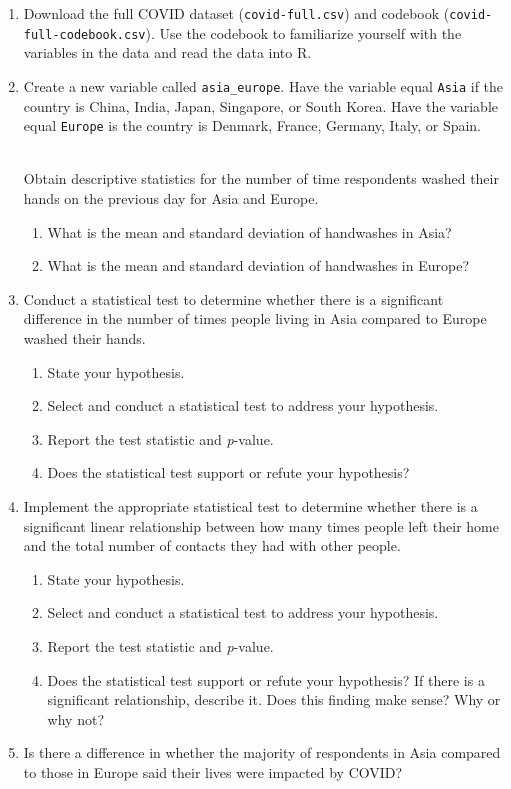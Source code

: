 \documentclass[
]{article}
\providecommand{\tightlist}{%
  \setlength{\itemsep}{0pt}\setlength{\parskip}{0pt}}\usepackage{longtable,booktabs,array}
\begin{document}
\begin{enumerate}
\def\labelenumi{\arabic{enumi})}
\item
  Download the full COVID dataset (\texttt{covid-full.csv}) and codebook
  (\texttt{covid-full-codebook.csv}). Use the codebook to familiarize
  yourself with the variables in the data and read the data into R.
\item
  Create a new variable called \texttt{asia\_europe}. Have the variable
  equal \texttt{Asia} if the country is China, India, Japan, Singapore,
  or South Korea. Have the variable equal \texttt{Europe} is the country
  is Denmark, France, Germany, Italy, or Spain.\\
  \strut \\
  Obtain descriptive statistics for the number of time respondents
  washed their hands on the previous day for Asia and Europe.

  \begin{enumerate}
  \def\labelenumii{\alph{enumii})}
  \tightlist
  \item
    What is the mean and standard deviation of handwashes in Asia?
  \item
    What is the mean and standard deviation of handwashes in Europe?
  \end{enumerate}
\item
  Conduct a statistical test to determine whether there is a significant
  difference in the number of times people living in Asia compared to
  Europe washed their hands.

  \begin{enumerate}
  \def\labelenumii{\alph{enumii})}
  \tightlist
  \item
    State your hypothesis.
  \item
    Select and conduct a statistical test to address your hypothesis.
  \item
    Report the test statistic and \emph{p}-value.
  \item
    Does the statistical test support or refute your hypothesis?
  \end{enumerate}
\item
  Implement the appropriate statistical test to determine whether there
  is a significant linear relationship between how many times people
  left their home and the total number of contacts they had with other
  people.

  \begin{enumerate}
  \def\labelenumii{\alph{enumii})}
  \tightlist
  \item
    State your hypothesis.
  \item
    Select and conduct a statistical test to address your hypothesis.
  \item
    Report the test statistic and \emph{p}-value.
  \item
    Does the statistical test support or refute your hypothesis? If
    there is a significant relationship, describe it. Does this finding
    make sense? Why or why not?
  \end{enumerate}
\item
  Is there a difference in whether the majority of respondents in Asia
  compared to those in Europe said their lives were impacted by COVID?


\end{enumerate}
\end{document}
